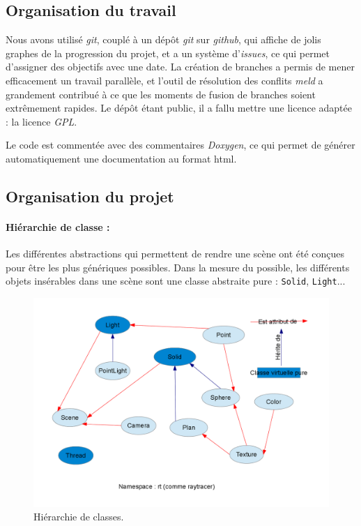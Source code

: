 \subsection{Organisation du travail}
  Nous avons utilisé \emph{git}, couplé à un dépôt \emph{git} sur \emph{github}, qui affiche de jolis graphes de la progression du projet, 
  et a un système d'\emph{issues}, ce qui permet d'assigner des objectifs avec une date. 
   La création de branches a permis de mener efficacement un travail parallèle, et l'outil de résolution des conflits \emph{meld} a grandement contribué à ce que les moments
  de fusion de branches soient extrêmement rapides.
  Le dépôt étant public, il a fallu mettre une licence adaptée : la licence \emph{GPL}.
  
  Le code est commentée avec des commentaires \emph{Doxygen}, ce qui permet de générer automatiquement une documentation au format html.
  
\subsection{Organisation du projet}

\paragraph{Hiérarchie de classe : } 
Les différentes abstractions qui permettent de rendre une scène ont été conçues pour être les plus génériques possibles. Dans la mesure du possible, les différents  objets insérables dans une scène sont une classe abstraite pure : \verb|Solid|, \verb|Light|...
\begin{figure}[h]
\begin{center}
\includegraphics[scale=0.35]{hierarchie.png}
\end{center}
\caption{Hiérarchie de classes.}
\end{figure}

